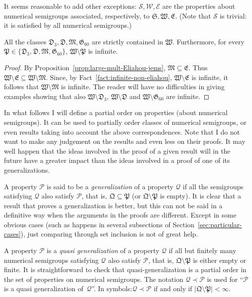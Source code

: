It seems reasonable to add other exceptions: $\mathcal{S},\mathcal{W}, \mathcal{E}$ are the properties about numerical semigroups associated, respectively, to $\mathfrak{S},\mathfrak{W}, \mathfrak{E}$. (Note that $\mathcal{S}$ is trivial: it is satisfied by all numerical semigroups.)

\begin{fact}
	All the classes $\mathfrak{D}_3,\mathfrak{D},\mathfrak{M},\mathfrak{G}_{60}$ are strictly contained in $\mathfrak{W}$.
	Furthermore, for every $\mathfrak{P}\in \{\mathfrak{D}_3,\mathfrak{D},\mathfrak{M},\mathfrak{G}_{60}\}$, $ \mathfrak{W}\setminus \mathfrak{P}$ is infinite. 
\end{fact}
\begin{proof}
	By Proposition~\ref{prop:large-mult-Eliahou-jems}, $\mathfrak{M}\subseteq \mathfrak{E}$. Thus $\mathfrak{W}\setminus\mathfrak{E}\subseteq\mathfrak{W}\setminus\mathfrak{M}$.
	Since, by Fact~\ref{fact:infinite-non-eliahou}, $\mathfrak{W}\setminus \mathfrak{E}$ is infinite, it follows that $ \mathfrak{W}\setminus \mathfrak{M}$ is infinite.
    The reader will have no difficulties in giving examples showing that also $\mathfrak{W}\setminus \mathfrak{D}_3$, $\mathfrak{W}\setminus \mathfrak{D}$ and $\mathfrak{W}\setminus \mathfrak{G}_{60}$ are infinite.
\end{proof}

In what follows I will define a partial order on properties (about numerical semigroups). It can be used to partially order classes of numerical semigroups, or even results taking into account the above correspondences. Note that I do not want to make any judgement on the results and even less on their proofs. It may well happen that the ideas involved in the proof of a given result will in the future have a greater impact than the ideas involved in a proof of one of its generalizations.

A property $\mathcal{P}$ is said to be a \emph{generalization} of a property $\mathcal{Q}$ if all the semigroups satisfying  $\mathcal{Q}$  also satisfy $\mathcal{P}$, that is, $\mathfrak{Q}\subseteq \mathfrak{P}$ (or $\mathfrak{Q}\setminus \mathfrak{P}$ is empty).
It is clear that a result that proves a generalization is better, but this can not be said in a definitive way when the arguments in the proofs are different.
Except in some obvious cases (such as happens in several subsections of Section~\ref{sec:particular-cases}), just comparing through set inclusion is not of great help.

A property $\mathcal{P}$ is a \emph{quasi generalization} of a property $\mathcal{Q}$ if all but finitely many numerical semigroups satisfying $\mathcal{Q}$  also satisfy $\mathcal{P}$, that is, $\mathfrak{Q}\setminus \mathfrak{P}$ is either empty or finite. 
It is straightforward to check that quasi-generalization is a partial order in the set of properties on numerical semigroups.
The notation $\mathcal{Q}\prec\mathcal{P}$ is used for ``$\mathcal{P}$ is a quasi generalization of~$\mathcal{Q}$''.
%
In symbols:\quad $\mathcal{Q}\prec\mathcal{P} \text{ if and only if } \left|\mathfrak{Q}\setminus \mathfrak{P}\right| < \infty$.

